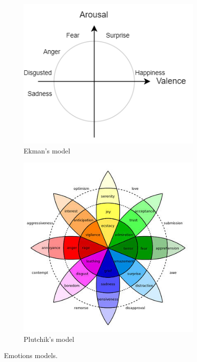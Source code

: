   \begin{figure}[h]
    \begin{subfigure}{.5\textwidth}
    \centering
      \includegraphics[width=1\linewidth]{figs/ekmans_model.png}
      \caption{Ekman's model}
    \end{subfigure}%
    \begin{subfigure}{.5\textwidth}
    \centering
      \includegraphics[width=1\linewidth]{figs/plutchiks_model.jpg}
      \caption{Plutchik's model}
    \end{subfigure}
    \caption{Emotions models.}
    \label{fig:c2:emotions_models}
  \end{figure}